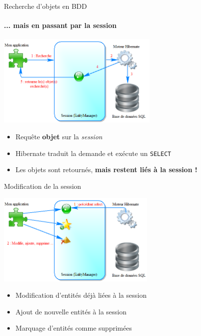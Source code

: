 \documentclass[compact]{beamer}%
\begin{document}
\begin{frame}{Recherche d'objets en BDD}
	\framesubtitle{... mais en passant par la session}
	
	\begin{center}
	\includegraphics[height=4.5cm]{images/with_orm_select.png}	
	\end{center}
	
	\begin{itemize}
	\item Requête \textbf{objet} sur la \emph{session}
	\item Hibernate traduit la demande et exécute un \texttt{SELECT}
	\item Les objets sont retournés, \textbf{mais restent liés à la session !}
	\end{itemize}
	
\end{frame}

\begin{frame}{Modification de la session}
	
	\begin{center}
	\includegraphics[height=4.5cm]{images/with_orm_modify.png}	
	\end{center}
	
	\begin{itemize}
	\item Modification d'entités déjà liées à la session
	\item Ajout de nouvelle entités à la session
	\item Marquage d'entités comme supprimées
	\end{itemize}
	
\end{frame}
\end{document}
